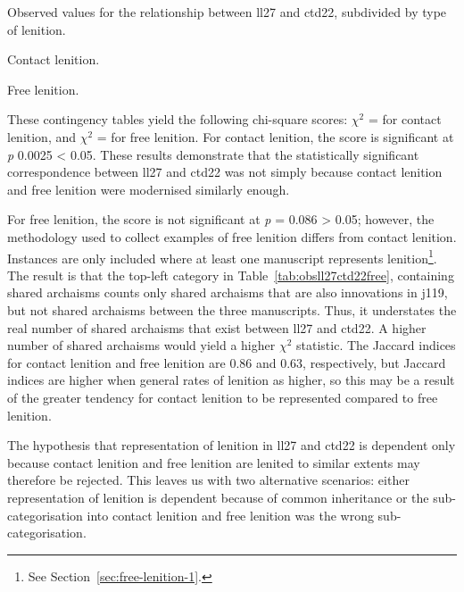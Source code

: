 \begin{table}[h]
  \caption{Observed values for the relationship between  \acrshort{ll27} and \acrshort{ctd22}, subdivided by type of lenition.}
  \label{tab:obsll27ctd22freecontact}
  \begin{subtable}[b]{0.5\linewidth}
    \centering
    \caption{Contact lenition.}
    \label{tab:contactlentab}
    
  \end{subtable}%
  \begin{subtable}[b]{0.5\linewidth}
    \centering
    \caption{Free lenition.}
    \label{tab:obsll27ctd22free}
    
  \end{subtable}
\end{table}

These contingency tables yield the following chi-square scores: \(\chi^2\) =  for contact lenition, and \(\chi^2\) =  for free lenition. For contact lenition, the score is significant at \emph{p} 0.0025 < 0.05. These results  demonstrate that the statistically significant correspondence between \gls{ll27} and \gls{ctd22} was not simply because contact lenition and free lenition were modernised similarly enough. 

For free lenition, the score is not significant at \emph{p} = 0.086 > 0.05; however, the methodology used to collect examples of free lenition differs from contact lenition. Instances are only included where at least one manuscript represents lenition\footnote{See Section~\ref{sec:free-lenition-1}.}. The result is that the top-left category in Table~\ref{tab:obsll27ctd22free}, containing shared archaisms counts only shared archaisms that are also innovations in \gls{j119}, but not shared archaisms between the three manuscripts. Thus, it understates the real number of shared archaisms that exist between \gls{ll27} and \gls{ctd22}. A higher number of shared archaisms would yield a higher \(\chi^2\) statistic. The Jaccard indices for contact lenition and free lenition are 0.86 and 0.63, respectively, but Jaccard indices are higher when general rates of lenition as higher, so this may be a result of the greater tendency for contact lenition to be represented compared to free lenition.

The hypothesis that representation of lenition in \gls{ll27} and \gls{ctd22} is dependent only because contact lenition and free lenition are lenited to similar extents may therefore be rejected. This leaves us with two alternative scenarios: either representation of lenition is dependent because of common inheritance or the sub-categorisation into contact lenition and free lenition was the wrong sub-categorisation. 

